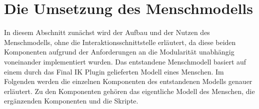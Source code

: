 \section{Die Umsetzung des Menschmodells}\label{sec:DasMenschmodell}
In diesem Abschnitt zunächst wird der Aufbau und der Nutzen des Menschmodells, ohne die Interaktionsschnittstelle erläutert, da diese beiden Komponenten aufgrund der Anforderungen an die Modularität unabhängig voneinander implementiert wurden. Das entstandene Menschmodell basiert auf einem durch das Final IK Plugin gelieferten Modell eines Menschen. Im Folgenden werden die einzelnen Komponenten des entstandenen Modells genauer erläutert. Zu den Komponenten gehören das eigentliche Modell des Menschen, die ergänzenden Komponenten und die Skripte.

